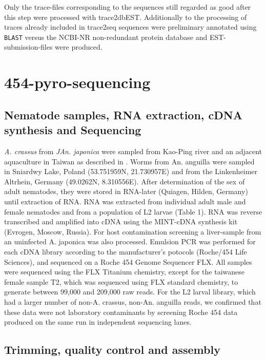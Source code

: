 Only the trace-files corresponding to the sequences still regarded as
good after this step were processed with trace2dbEST. Additionally to
the processing of traces already included in trace2seq sequences were
preliminary annotated using \texttt{BLAST} versus the NCBI-NR
non-redundant protein database and EST-submission-files were produced.

\section{454-pyro-sequencing}

\subsection*{Nematode samples, RNA extraction, cDNA synthesis and Sequencing}

\textit{A. crassus} from \textit{JAn. japonica} were sampled from
Kao-Ping river and an adjacent aquaculture in Taiwan as described in
\cite{heitlinger_massive_2009}. Worms from An. anguilla were sampled
in Sniardwy Lake, Poland (53.751959N, 21.730957E) and from the
Linkenheimer Altrhein, Germany (49.0262N, 8.310556E). After
determination of the sex of adult nematodes, they were stored in
RNA-later (Quiagen, Hilden, Germany) until extraction of RNA. RNA was
extracted from individual adult male and female nematodes and from a
population of L2 larvae (Table 1). RNA was reverse transcribed and
amplified into cDNA using the MINT-cDNA synthesis kit (Evrogen,
Moscow, Russia).  For host contamination screening a liver-sample from
an uninfected A. japonica was also processed.  Emulsion PCR was
performed for each cDNA library according to the manufacturer’s
potocols (Roche/454 Life Sciences), and sequenced on a Roche 454
Genome Sequencer FLX. All samples were sequenced using the FLX
Titanium chemistry, except for the taiwanese female sample T2, which
was sequenced using FLX standard chemistry, to generate between 99,000
and 209,000 raw reads. For the L2 larval library, which had a larger
number of non-A. crassus, non-An. anguilla reads, we confirmed that
these data were not laboratory contaminants by screening Roche 454
data produced on the same run in independent sequencing lanes.


\subsection*{Trimming, quality control and assembly}

